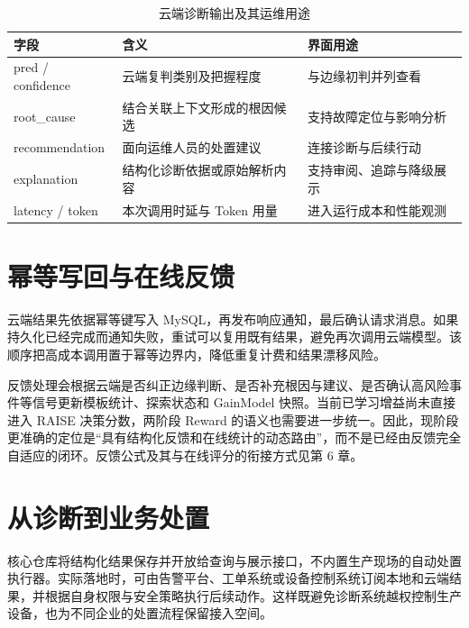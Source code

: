 \begin{table}[htbp]
  \centering
  \small
  \caption{云端诊断输出及其运维用途}
  \label{tab:cloud-output}
  \begin{tabularx}{\textwidth}{>{\ttfamily}p{} X X}
    \toprule
    \normalfont\bfseries 字段 & \textbf{含义} & \textbf{界面用途} \\
    \midrule
    pred / confidence & 云端复判类别及把握程度 & 与边缘初判并列查看 \\
    root\_cause & 结合关联上下文形成的根因候选 & 支持故障定位与影响分析 \\
    recommendation & 面向运维人员的处置建议 & 连接诊断与后续行动 \\
    explanation & 结构化诊断依据或原始解析内容 & 支持审阅、追踪与降级展示 \\
    latency / token & 本次调用时延与 Token 用量 & 进入运行成本和性能观测 \\
    \bottomrule
  \end{tabularx}
\end{table}

\section{幂等写回与在线反馈}
云端结果先依据幂等键写入 MySQL，再发布响应通知，最后确认请求消息。如果持久化已经完成而通知失败，重试可以复用既有结果，避免再次调用云端模型。该顺序把高成本调用置于幂等边界内，降低重复计费和结果漂移风险。

反馈处理会根据云端是否纠正边缘判断、是否补充根因与建议、是否确认高风险事件等信号更新模板统计、探索状态和 GainModel 快照。当前已学习增益尚未直接进入 RAISE 决策分数，两阶段 Reward 的语义也需要进一步统一。因此，现阶段更准确的定位是“具有结构化反馈和在线统计的动态路由”，而不是已经由反馈完全自适应的闭环。反馈公式及其与在线评分的衔接方式见第 6 章。

\section{从诊断到业务处置}
核心仓库将结构化结果保存并开放给查询与展示接口，不内置生产现场的自动处置执行器。实际落地时，可由告警平台、工单系统或设备控制系统订阅本地和云端结果，并根据自身权限与安全策略执行后续动作。这样既避免诊断系统越权控制生产设备，也为不同企业的处置流程保留接入空间。
